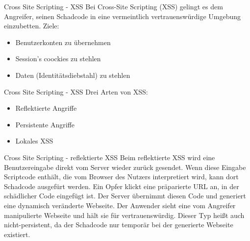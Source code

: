 \documentclass[10pt]{beamer}
\begin{document}
\begin{frame}[fragile]{Cross Site Scripting - XSS}
  Bei Cross-Site Scripting (XSS) gelingt es dem Angreifer, seinen Schadcode in eine vermeintlich vertrauenswürdige Umgebung einzubetten.
  \newline
  Ziele:
  \begin{itemize}
    \item Benutzerkonten zu \"ubernehmen
    \item Session's coockies zu stehlen
    \item Daten (Identit\"atsdiebstahl) zu stehlen
  \end{itemize}
\end{frame}

\begin{frame}[fragile]{Cross Site Scripting - XSS}
  Drei Arten von XSS:
  \begin{itemize}
    \item Reflektierte Angriffe
    \item Persistente Angriffe
    \item Lokales XSS
  \end{itemize}
\end{frame}

\begin{frame}[fragile]{Cross Site Scripting - reflektierte XSS}
  Beim reflektierte XSS wird eine Benutzereingabe direkt vom Server wieder zur\"uck gesendet.
  Wenn diese Eingabe Scriptcode enth\"alt, die vom Browser des Nutzers interpretiert wird, kann dort Schadcode ausgef\"urt werden.
  \newline
  \newline
  Ein Opfer klickt eine pr\"aparierte URL an, in der sch\"adlicher Code eingef\"ugt ist. Der Server \"ubernimmt diesen Code und generiert eine dynamisch ver\"anderte Webseite. Der Anwender sieht eine vom Angreifer manipulierte Webseite und h\"alt sie für vertrauensw\"urdig. 
  \newline
  \newline
  Dieser Typ hei{\ss}t auch nicht-persistent, da der Schadcode nur tempor\"ar bei der generierte Webseite existiert.
\end{frame}
\end{document}
